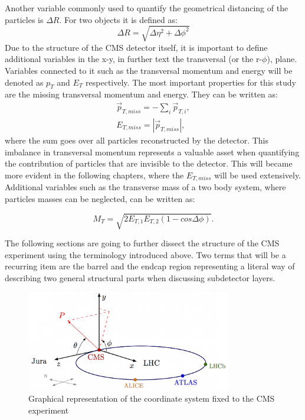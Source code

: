 Another variable commonly used to quantify the geometrical distancing of the particles is $\Delta R$. For two objects it is defined as:
\begin{equation}
\Delta R = \sqrt{\Delta\eta^2+\Delta\phi^2}
\end{equation}
Due to the structure of the CMS detector itself, it is important to define additional variables in the x-y, in further text the transversal (or the r-$\phi$), plane. Variables connected to it such as the transversal momentum and energy will be denoted as $p_T$ and $E_T$ respectively. The most important properties for this study are the missing transversal momentum and energy. They can be written as:
\begin{equation}
\begin{array}{l}
\vec{p}_{T, miss} = -\sum_i\vec{p}_{T,i},\\
E_{T, miss} = |\vec{p}_{T, miss} |,
\end{array}
\label{for:met}
\end{equation}
where the sum goes over all particles reconstructed by the detector. This imbalance in transversal momentum represents a valuable asset when quantifying the contribution of particles that are invisible to the detector. This will became more evident in the following chapters, where the $E_{T,miss}$ will be used extensively. 
Additional variables such as the transverse mass of a two body system, where particles masses can be neglected, can be written as:

\begin{equation}
    M_T = \sqrt{2E_{T,1}E_{T,2}(1-cos\Delta\phi)}.
\end{equation}

The following sections are going to further dissect the structure of the CMS experiment using the terminology introduced above. Two terms that will be a recurring item are the barrel and the endcap region representing a literal way of describing two general structural parts when discussing subdetector layers.
 
\begin{figure}[htbp]
  \centering
    \includegraphics[width=0.8\textwidth]{CMS_experiment/cms_coordinate_system.png}
  \caption[Graphical representation of the coordinate system fixed to the CMS experiment.]{Graphical representation of the coordinate system fixed to the CMS experiment~\cite{coord_syst}}
  \label{fig:cms_coord_syst}
\end{figure}




